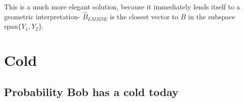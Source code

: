 \documentclass[paper=a4, fontsize=11pt]{scrartcl} %
\numberwithin{equation}{section} %
\numberwithin{figure}{section} %
\numberwithin{table}{section} %
\begin{document}
This is a much more elegant solution, because it immediately lends itself to a geometric interpretation- $\hat{B}_{LMMSE}$ is the closest vector to $B$ in the subspace $\textrm{span}\{Y_1, Y_2\}$. 


\section{Cold}

\subsection{Probability Bob has a cold today}
\end{document}
